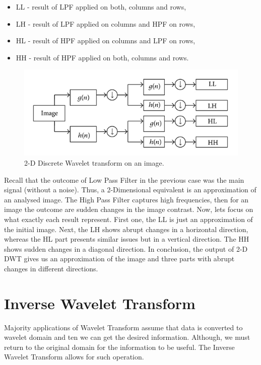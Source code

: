\begin{itemize}
\item LL - result of LPF applied on both, columns and rows,
\item LH - result of LPF applied on columns and HPF on rows,
\item HL - result of HPF applied on columns and LPF on rows,
\item HH - result of HPF applied on both, columns and rows.
\end{itemize}  

\begin{figure}[h]
	\centering
	\includegraphics[width=\textwidth]{2D_DWT.JPG}
	\caption{2-D Discrete Wavelet transform on an image.}
	\label{fig:2D_DWT}
\end{figure}

Recall that the outcome of Low Pass Filter in the previous case was the main signal (without a noise). Thus, a 2-Dimensional equivalent is an approximation of an analysed image. The High Pass Filter captures high frequencies, then for an image the outcome are sudden changes in the image contrast. Now, lets focus on what exactly each result represent. First one, the LL is just an approximation of the initial image. Next, the LH shows abrupt changes in a horizontal direction, whereas the HL part presents similar issues but in a vertical direction. The HH shows sudden changes in a diagonal direction. In conclusion, the output of 2-D DWT gives us an approximation of the image and three parts with abrupt changes in different directions.

\section{Inverse Wavelet Transform}

Majority applications of Wavelet Transform assume that data is converted to wavelet domain and ten we can get the desired information. Although, we must return to the original domain for the information to be useful. The Inverse Wavelet Transform allows for such operation.

